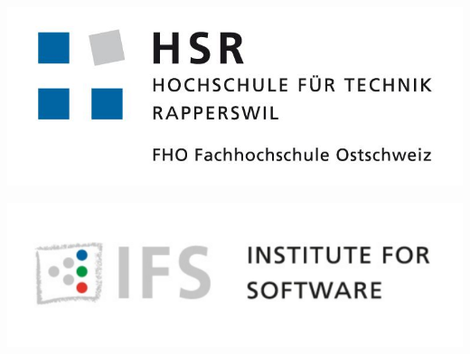 

\begin{titlepage}

\begin{center}
\begin{minipage}[t]{0.45\textwidth}
    \includegraphics[width=\textwidth]{start/img/hsrLogo}
\end{minipage}
\hspace{\fill} %
\begin{minipage}[t]{0.45\textwidth}
    \vspace{-3.26cm}
    \includegraphics[width=\textwidth]{start/img/ifsLogo}
\end{minipage}

\end{center}

\vspace{15ex} %
\begin{center}
	\Huge 
	\begin{framed}
		\textbf{\titel}
	\end{framed}
	
	\vspace{3ex}
	\textbf{\work}
	
	\vspace{1ex}
	\LARGE 
	\place
	

\end{center}
\end{titlepage}
